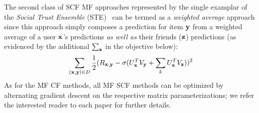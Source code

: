 The second class of SCF MF approaches represented by the single
examplar of the {\it Social Trust Ensemble} (STE)~\cite{ste} can be termed as a
\emph{weighted average} approach since this approach simply composes a
prediction for item $\mathbf{y}$ from a weighted average of a user $\mathbf{x}$'s
predictions \emph{as well as} their friends ($\mathbf{z}$) predictions (as
evidenced by the additional $\sum_{\mathbf{z}}$ in the objective below):
\begin{align}
\sum_{(\mathbf{x},\mathbf{y}) \in D} \frac{1}{2} (R_{\mathbf{x},\mathbf{y}} - \sigma (U_{\mathbf{x}}^T V_{\mathbf{y}} + \sum_k U_{\mathbf{x}}^T V_{\mathbf{z}}))^2 
\end{align}
As for the MF CF methods, all MF SCF methods can be optimized by alternating
gradient descent on the respective matrix parameterizations; we refer
the interested reader to each paper for further details.

